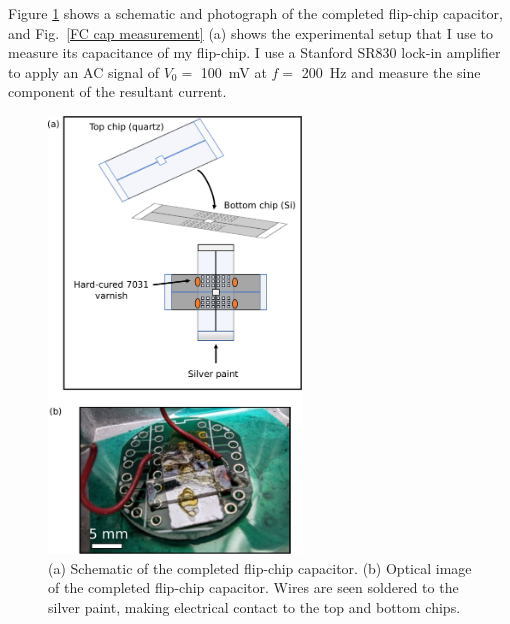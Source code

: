 \documentclass{beavtex_dub_edit}
\begin{document}
Figure \ref{flipping chips} shows a schematic and photograph of the completed flip-chip capacitor, and Fig.\ \ref{FC cap measurement} (a) shows the experimental setup that I use to measure its capacitance of my flip-chip. I use a Stanford SR830 lock-in amplifier to apply an AC signal of $V_0 = $ \SI{100}{\milli\volt} at $f = $ \SI{200}{\hertz} and measure the sine component of the resultant current. 

\begin{figure}
    \includegraphics[width=0.6\textwidth]{flipping chips.pdf}
    \caption[(a) Schematic of the completed flip-chip capacitor. (b) Optical image of the completed flip-chip capacitor.]{(a) Schematic of the completed flip-chip capacitor. (b) Optical image of the completed flip-chip capacitor. Wires are seen soldered to the silver paint, making electrical contact to the top and bottom chips.}
    \label{flipping chips}
\end{figure}
\end{document}
